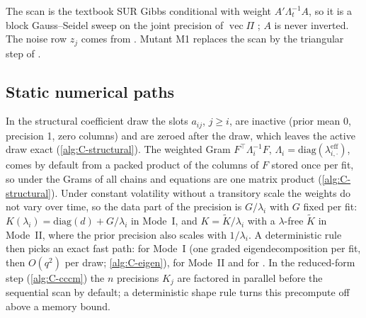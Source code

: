 The scan is the textbook SUR Gibbs conditional with weight $A'\Lambda_t^{-1}A$, so it is a block
Gauss--Seidel sweep on the joint precision of $\operatorname{vec}\Pi$ \citep{fox2017accelerated};
$A$ is never inverted.
The noise row $z_j$ comes from .
Mutant M1 replaces the scan by the triangular step of \citet{carriero2019large}.

\subsection{Static numerical paths}\label{app:coef-paths}

In the structural coefficient draw the slots $a_{ij}$, $j \ge i$, are inactive (prior mean 0,
precision 1, zero columns) and are zeroed after the draw, which leaves the active draw exact
(\cref{alg:C-structural}). %
The weighted Gram $F^\top\Lambda_i^{-1}F$, $\Lambda_i = \mathrm{diag}(\lambda^{\mathrm{eff}}_{i,\cdot})$,
comes by default from a packed product of the columns of $F$ stored once per fit, so under
 the Grams of all chains and equations are one matrix product (\cref{alg:C-structural}). %
Under constant volatility without a transitory scale the weights do not vary over time, so the data
part of the precision is $G/\lambda_i$ with $G$ fixed per fit: $K(\lambda_i) = \mathrm{diag}(d) +
G/\lambda_i$ in Mode~I, and $K = \tilde K/\lambda_i$ with a $\lambda$-free $\tilde K$ in Mode~II, where
the prior precision also scales with $1/\lambda_i$. A deterministic rule then picks an exact fast
path:  for Mode~I (one graded eigendecomposition per fit, then $O(q^2)$ per draw;
\cref{alg:C-eigen}),  for Mode~II and  for
. %
In the reduced-form step (\cref{alg:C-cccm}) the $n$ precisions $K_j$ are factored in parallel
before the sequential scan by default; a deterministic shape rule turns this precompute off above a
memory bound. %

